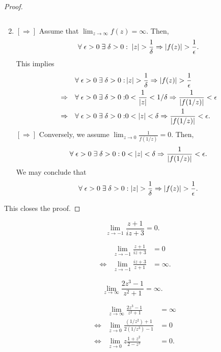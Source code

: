 \documentclass[12pt]{book}
\begin{document}
\begin{proof}
\begin{enumerate}[label = {(\roman*)}]
$$            $$
        \item
            $\mathbf{[\Rightarrow]}$ Assume that $\lim_{z \rightarrow \infty} f(z) = \infty.$ Then,
            $$
                \forall\; \epsilon > 0\; \exists\; \delta > 0: \; \left\lvert z \right\rvert > \frac{1}{\delta} \Rightarrow \left\lvert f(z) \right\rvert > \frac{1}{\epsilon}.
            $$
            This implies
            \begin{align*}
                &&\forall\; \epsilon > 0\; \exists\; \delta > 0: 
                    &\left\lvert z \right\rvert > \frac{1}{\delta} \Rightarrow \left\lvert f(z) \right\rvert > \frac{1}{\epsilon} \\
                &\Rightarrow &\forall\; \epsilon > 0\; \exists\; \delta > 0:
                    &0 < \frac{1}{\left\lvert z \right\rvert} < 1 / \delta \Rightarrow \frac{1}{\left\lvert f(1/z) \right\rvert} < \epsilon \\
                &\Rightarrow &\forall\; \epsilon > 0\; \exists\; \delta > 0:
                    &0 < \left\lvert z \right\rvert < \delta \Rightarrow \frac{1}{\left\lvert f(1/z) \right\rvert} < \epsilon.  
            \end{align*}
            $\mathbf{[\Rightarrow]}$ Conversely, we assume $\lim_{z \rightarrow 0} \frac{1}{f(1/z)} = 0.$ Then, 
            $$
                \forall\; \epsilon > 0\; \exists\; \delta > 0: 0 < \left\lvert z \right\rvert < \delta \Rightarrow \frac{1}{\left\lvert f(1/z) \right\rvert} < \epsilon.
            $$
            We may conclude that 
            $$
                \forall\; \epsilon > 0\; \exists\; \delta > 0: \left\lvert z \right\rvert > \frac{1}{\delta} \Rightarrow \left\lvert f(z) \right\rvert > \frac{1}{\epsilon}.
            $$
    \end{enumerate}
    This closes the proof.
\end{proof}


\begin{exmp}
    $$
        \lim_{z \rightarrow -1} \frac{z + 1}{iz + 3} = 0.
    $$
\end{exmp}
\begin{align*}
    &&\lim_{z \rightarrow -1} \frac{z + 1}{iz + 3} 
        &= 
            0 \\
    &\iff &\lim_{z \rightarrow -1} \frac{iz + 3}{z + 1} 
        &= 
            \infty.
\end{align*}

\begin{exmp}
    $$
        \lim_{z \rightarrow \infty} \frac{2z^3 - 1}{z^2 + 1} = \infty.
    $$
\end{exmp}
\begin{align*}
    &&\lim_{z \rightarrow \infty} \frac{2z^3 - 1}{z^2 + 1} 
        &= 
            \infty \\
    &\iff &\lim_{z \rightarrow 0} \frac{(1/z^2) + 1}{2(1/z^3) - 1} 
        &= 
            0 \\
    &\iff &\lim_{z \rightarrow 0} z\frac{1 + z^2}{2 - z^3}  
        &= 
            0.
\end{align*}
\end{document}
